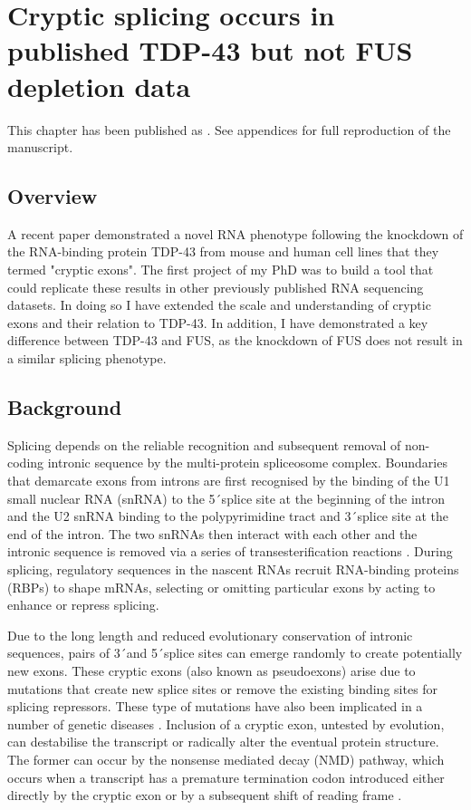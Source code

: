 \chapter{Cryptic splicing occurs in published TDP-43 but not FUS depletion data}
\label{chapter:cryptic_exons}

This chapter has been published as \citep{Humphrey2017}. See appendices for full reproduction of the manuscript.

\section{Overview}
A recent paper \citep{Ling2015} demonstrated a novel RNA phenotype following the knockdown of the RNA-binding protein TDP-43 from mouse and human cell lines that they termed "cryptic exons". The first project of my PhD was to build a tool that could replicate these results in other previously published RNA sequencing datasets. In doing so I have extended the scale and understanding of cryptic exons and their relation to TDP-43. In addition, I have demonstrated a key difference between TDP-43 and FUS, as the knockdown of FUS does not result in a similar splicing phenotype.

\section{Background}

Splicing depends on the reliable recognition and subsequent removal of non-coding intronic sequence by the multi-protein spliceosome complex. Boundaries that demarcate exons from introns are first recognised by the binding of the U1 small nuclear RNA (snRNA) to the 5\'\ splice site at the beginning of the intron and the U2 snRNA binding to the polypyrimidine tract and 3\'\ splice site at the end of the intron. The two snRNAs then interact with each other and the intronic sequence is removed via a series of transesterification reactions  \citep{Matera2014-pu}.  During splicing, regulatory sequences in the nascent RNAs recruit RNA-binding proteins (RBPs) to shape mRNAs, selecting or omitting particular exons by acting to enhance or repress splicing.

Due to the long length and reduced evolutionary conservation of intronic sequences, pairs of 3\'\ and 5\'\ splice sites can emerge randomly to create potentially new exons. These cryptic exons (also known as pseudoexons) arise due to mutations that create new splice sites or remove the existing binding sites for splicing repressors. These type of mutations have also been implicated in a number of genetic diseases \citep{Eng2004-lq, Buratti2007-iz, Vorechovsky2006-wb,Meili2009-hc}. Inclusion of a cryptic exon, untested by evolution, can destabilise the transcript or radically alter the eventual protein structure. The former can occur by the nonsense mediated decay (NMD) pathway, which occurs when a transcript has a premature termination codon introduced either directly by the cryptic exon or by a subsequent shift of reading frame \citep{McGlincy2008-wh}. 

